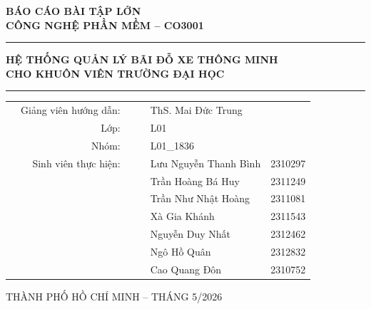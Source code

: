 \begin{titlepage}
\vspace{0.2cm}


\begin{center}
\textbf{{\LARGE BÁO CÁO BÀI TẬP LỚN}} \\[0.5cm]
\textbf{{\LARGE CÔNG NGHỆ PHẦN MỀM -- CO3001}}\\[0.5cm]
\color{blue}
\hrule

\vspace{1cm}

\textbf{{\Large HỆ THỐNG QUẢN LÝ BÃI ĐỖ XE THÔNG MINH }}\\[0.1cm]
\textbf{{\Large CHO KHUÔN VIÊN TRƯỜNG ĐẠI HỌC  }}\\[1cm]

\hrule

\vspace{.5cm}


\begin{table}[h]
    \large
    \centering

    \begin{tabular}{rrrrlr}
        
        & Giảng viên hướng dẫn:&& & ThS. Mai Đức Trung & \\[0.25cm]
        & Lớp: &&& L01 & \\[0.25cm]
        & Nhóm: &&& L01\_1836 & \\[0.25cm]
        
        & Sinh viên thực hiện: &&& Lưu Nguyễn Thanh Bình  & 2310297 \\[0.1cm]
        &                      &&& Trần Hoàng Bá Huy  & 2311249 \\[0.1cm]         
        &                      &&& Trần Như Nhật Hoàng  & 2311081 \\[0.1cm]
        &                      &&& Xà Gia Khánh  & 2311543 \\[0.1cm]
        &                      &&& Nguyễn Duy Nhất & 2312462 \\[0.1cm]
        &                      &&& Ngô Hồ Quân  & 

2312832 \\[0.1cm]
        &                      &&& Cao Quang Đôn  & 2310752 \\[0.1cm]        
    \end{tabular}
\end{table}


\end{center}


\vspace{2cm}
\centerline{\large THÀNH PHỐ HỒ CHÍ MINH -- THÁNG 5/2026}

\end{titlepage}

\restoregeometry
